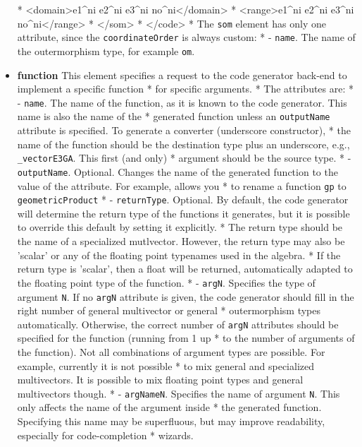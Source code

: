\documentclass[10pt, a4paper]{article}
\begin{document}
\begin{itemize}
 *     <domain>e1^ni e2^ni e3^ni no^ni</domain>
 *     <range>e1^ni e2^ni e3^ni no^ni</range> 
 *     </som>
 *     </code>
 *     The {\tt som} element has only one attribute, since the {\tt coordinateOrder} is always custom:
 *        - {\tt name}. The name of the outermorphism type, for example {\tt om}.
\item {\bf function} This element specifies a request to the code generator back-end to implement a specific function
 *     for specific arguments.
 *     The attributes are:
 *        - {\tt name}. The name of the function, as it is known to the code generator. This name is also the name of the
 *           generated function unless an {\tt outputName} attribute is specified. To generate a converter (underscore constructor),
 *           the name of the function should be the destination type plus an underscore, e.g., {\tt _vectorE3GA}. This first (and only)
 *           argument should be the source type.
 *        - {\tt outputName}. Optional. Changes the name of the generated function to the value of the attribute. For example, allows you
 *          to rename a function {\tt gp} to {\tt geometricProduct}
 *        - {\tt returnType}. Optional. By default, the code generator will determine the return type of the functions it generates, but it is possible to override this default by setting it explicitly. 
 *          The return type should be the name of a specialized mutlvector. However, the return type may also be 'scalar' or any of the floating point typenames used in the algebra.
 *          If the return type is 'scalar', then a float will be returned, automatically adapted to the floating point type of the function.
 *        - {\tt argN}. Specifies the type of argument {\tt N}. If no {\tt argN} attribute is given, the code generator should fill in the right number of general multivector or general 
 *           outermorphism types automatically. Otherwise, the correct number of {\tt argN} attributes should be specified for the function (running from 1 up
 *           to the number of arguments of the function). Not all combinations of argument types are possible. For example, currently it is not possible
 *           to mix general and specialized multivectors. It is possible to mix floating point types and general multivectors though.
 *        - {\tt argNameN}. Specifies the name of argument {\tt N}. This only affects the name of the argument inside
 *           the generated function. Specifying this name may be superfluous, but may improve readability, especially for code-completion
 *           wizards. 

\end{itemize}
\end{document}
